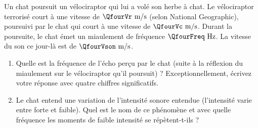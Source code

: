 
Un chat poursuit un vélociraptor qui lui a volé son herbe à chat. Le vélociraptor terrorisé court à une vitesse de $\QfourVr\text{ m/s}$ (selon National Geographic), poursuivi par le chat qui court à une vitesse de $\QfourVc\text{ m/s}$. Durant la poursuite, le chat émet un miaulement de fréquence $\QfourFreq\text{ Hz}$. La vitesse du son ce jour-là est de $\QfourVson\text{ m/s}$.

\begin{enumerate}[label=\alph*)]
    \item Quelle est la fréquence de l'écho perçu par le chat (suite à la réflexion du miaulement sur le vélociraptor qu'il poursuit) ? Exceptionnellement, écrivez votre réponse avec quatre chiffres significatifs.
    \item Le chat entend une variation de l'intensité sonore entendue (l'intensité varie entre forte et faible). Quel est le nom de ce phénomène et avec quelle fréquence les moments de faible intensité se répètent-t-ils ?
\end{enumerate}

\vspace{0.4cm}